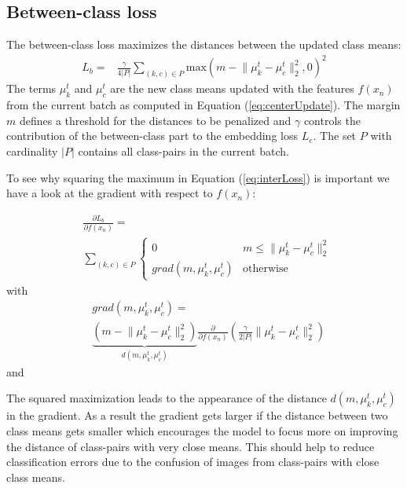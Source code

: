 \documentclass[10pt,twocolumn,letterpaper]{article}
\begin{document}
\subsection{Between-class loss}
\label{section:interLoss}
The between-class loss maximizes the distances between the updated class means:
\begin{align}
  \label{eq:interLoss}
  L_{b} =& \frac{\gamma}{4 \vert P \vert} \sum_{(k,c) \in P}  \text{max} \left ( m - \lVert \mu_k^t - \mu_c^t \rVert_2^2, 0 \right )^2
\end{align}
The terms $\mu_k^t$ and $\mu_c^t$ are the new class means updated with the features $f(x_n)$ from the current batch as computed in Equation (\ref{eq:centerUpdate}). The margin $m$ defines a threshold for the distances to be penalized and $\gamma$ controls the contribution of the between-class part to the embedding loss $L_e$. The set $P$ with cardinality $\vert P \vert$ contains all class-pairs in the current batch. 

To see why squaring the maximum in Equation (\ref{eq:interLoss}) is important we have a look at the gradient with respect to $f(x_n)$:

\begin{align}
  \label{eq:gradienticdbase}
  &\frac{\partial L_{b}}{\partial f(x_n)} = \nonumber\\
  &\sum \limits_{  (k,c) \in P } \begin{cases} 0  & m \le \lVert \mu_k^t - \mu_c^t \rVert_2^2 \\ grad(m,\mu_k^t,\mu_c^t)  & \text{otherwise} \end{cases}
\end{align}
with
\begin{align}
  \label{eq:gr}
  &grad(m,\mu_k^t,\mu_c^t) = \nonumber\\
  &\underbrace{(m - \lVert \mu_k^t - \mu_c^t \rVert_2^2)}_{d(m,\mu_k^t,\mu_c^t)} \frac{\partial}{\partial f(x_n)} \left ( \frac{\gamma}{2 \vert P \vert} \lVert \mu_k^t - \mu_c^t \rVert_2^2 \right )
\end{align}
and

The squared maximization leads to the appearance of the distance $d(m,\mu_k^t,\mu_c^t)$ in the gradient. As a result the gradient gets larger if the distance between two class means gets smaller which encourages the model to focus more on improving the distance of class-pairs with very close means. This should help to reduce classification errors due to the confusion of images from class-pairs with close class means.
\end{document}
